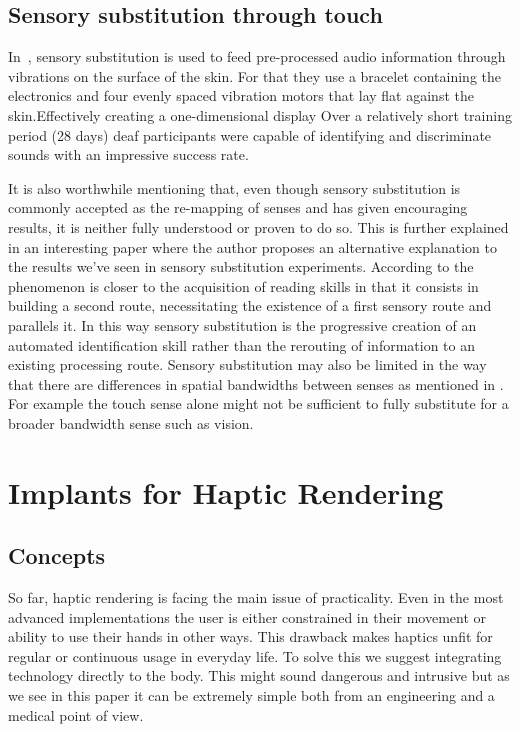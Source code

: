 \documentclass[10pt,journal,compsoc]{IEEEtran}
\begin{document}
	\subsection{Sensory substitution through touch}
	In~\cite{perrotta2021neuroscience}, sensory substitution is used to feed pre-processed audio information through vibrations on the surface of the skin. For that they use a bracelet containing the electronics and four evenly spaced vibration motors that lay flat against the skin.Effectively creating a one-dimensional display \cite{kaezmarek1991tbe} Over a relatively short training period (28 days) deaf participants were capable of identifying and discriminate sounds with an impressive success rate.
	
	It is also worthwhile mentioning that, even though sensory substitution is commonly accepted as the re-mapping of senses and has given encouraging results, it is neither fully understood or proven to do so. This is further explained in an interesting paper \cite{deroy2012fp} where the author proposes an alternative explanation to the results we've seen in  sensory substitution experiments. According to \cite{deroy2012fp} the phenomenon is closer to the acquisition of reading skills in that it consists in building a second route, necessitating the existence of a first sensory route and parallels it. In this way sensory substitution is the progressive creation of an automated identification skill rather than the rerouting of information to an existing processing route.
	Sensory substitution may also be limited in the way that there are differences in spatial bandwidths between senses as mentioned in \cite{deroy2012fp}. For example the touch sense alone might not be sufficient to fully substitute for a broader bandwidth sense such as vision.

\section{Implants for Haptic Rendering}
	\subsection{Concepts}
	So far, haptic rendering is facing the main issue of practicality. Even in the most advanced implementations the user is either constrained in their movement or ability to use their hands in other ways. This drawback makes haptics unfit for regular or continuous usage in everyday life. 
	To solve this we suggest integrating technology directly to the body. This might sound dangerous and intrusive but as we see in this paper it can be extremely simple both from an engineering and a medical point of view.
	
\end{document}
